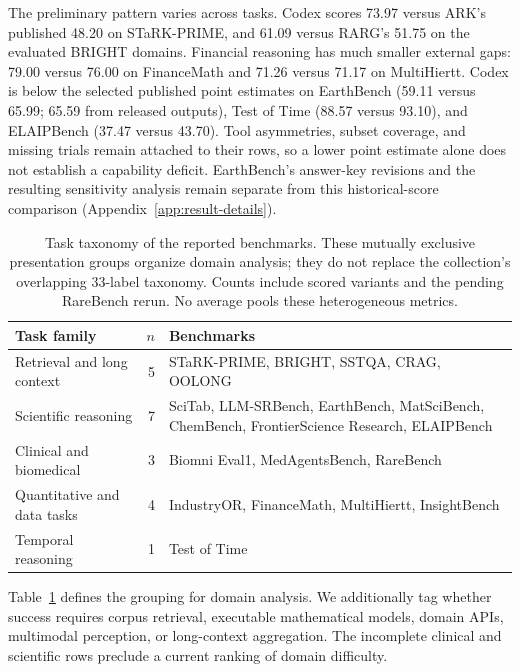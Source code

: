 The preliminary pattern varies across tasks. Codex scores 73.97 versus ARK's published 48.20
on STaRK-PRIME, and 61.09 versus RARG's 51.75 on the evaluated BRIGHT domains. Financial reasoning
has much smaller external gaps: 79.00 versus 76.00 on FinanceMath and 71.26 versus 71.17 on
MultiHiertt. Codex is below the selected published point estimates on EarthBench (59.11 versus
65.99; 65.59 from released outputs), Test of Time (88.57 versus 93.10), and ELAIPBench (37.47 versus 43.70). Tool asymmetries,
subset coverage, and missing trials remain attached to their rows, so a lower point estimate
alone does not establish a capability deficit. EarthBench's answer-key revisions and the
resulting sensitivity analysis remain separate from this historical-score comparison
(Appendix~\ref{app:result-details}).

\begin{table}[t]
\caption{Task taxonomy of the \StudyBenchmarkCount{} reported benchmarks. These mutually exclusive
presentation groups organize domain analysis; they do not replace the collection's overlapping
33-label taxonomy. Counts include scored variants and the pending RareBench rerun. No average pools these
heterogeneous metrics.}
\label{tab:domain-taxonomy}
\centering
\small
\setlength{\tabcolsep}{4pt}
\begin{tabular}{@{}p{3.1cm}rp{8.7cm}@{}}
\toprule
Task family & $n$ & Benchmarks \\
\midrule
Retrieval and long context & 5 & STaRK-PRIME, BRIGHT, SSTQA, CRAG, OOLONG \\
Scientific reasoning & 7 & SciTab, LLM-SRBench, EarthBench, MatSciBench, ChemBench,
FrontierScience Research, ELAIPBench \\
Clinical and biomedical & 3 & Biomni Eval1, MedAgentsBench, RareBench \\
Quantitative and data tasks & 4 & IndustryOR, FinanceMath, MultiHiertt, InsightBench \\
Temporal reasoning & 1 & Test of Time \\
\bottomrule
\end{tabular}
\end{table}

Table~\ref{tab:domain-taxonomy} defines the grouping for domain analysis. We additionally tag
whether success requires corpus retrieval, executable mathematical models, domain APIs,
multimodal perception, or long-context aggregation. 
The incomplete clinical and scientific rows preclude a current ranking of domain difficulty.

